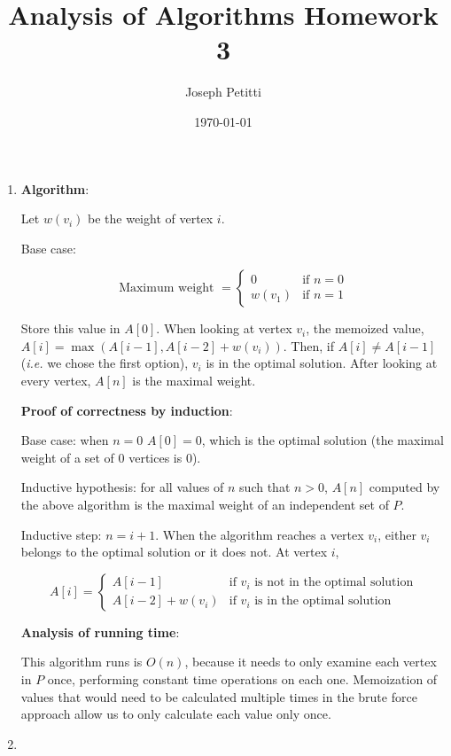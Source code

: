 \documentclass[a4paper, 10pt]{article}
\title{Analysis of Algorithms Homework 3}
\author{Joseph Petitti}
\date{\today}
\begin{document}
\maketitle

\begin{enumerate}
	\item \textbf{Algorithm}:

		Let $w(v_i)$ be the weight of vertex $i$.

		Base case:

		$$ \textrm{Maximum weight } =
		\begin{cases}
			0 & \textrm{if } n = 0 \\
			w(v_1) & \textrm{if } n = 1
		\end{cases} $$

		Store this value in $A[0]$. When looking at vertex $v_i$, the memoized
		value, $A[i] = \max ( A[i - 1], A[i - 2] + w(v_i))$. Then, if $A[i] \ne
		A[i - 1]$ (\textit{i.e.} we chose the first option), $v_i$ is in the
		optimal solution. After looking at every vertex, $A[n]$ is the maximal
		weight.

		\textbf{Proof of correctness by induction}:

		Base case: when $n = 0$ $A[0] = 0$, which is the optimal solution (the
		maximal weight of a set of 0 vertices is 0).

		Inductive hypothesis: for all values of $n$ such that $n > 0$, $A[n]$
		computed by the above algorithm is the maximal weight of an independent
		set of $P$.

		Inductive step: $n = i + 1$. When the algorithm reaches a vertex $v_i$,
		either $v_i$ belongs to the optimal solution or it does not. At vertex
		$i$, 
		
		\[ A[i] =
		\begin{cases}
			A[i - 1] & \textrm{if } v_i \textrm{ is not in the optimal
				solution} \\
			A[i -2] + w(v_i) & \textrm{if } v_i \textrm{ is in the optimal
				solution}
		\end{cases} \]

		\textbf{Analysis of running time}:
		
		This algorithm runs is $O(n)$, because it needs to only examine each
		vertex in $P$ once, performing constant time operations on each one.
		Memoization of values that would need to be calculated multiple times in
		the brute force approach allow us to only calculate each value only
		once.

	\item

\end{enumerate}
\end{document}

